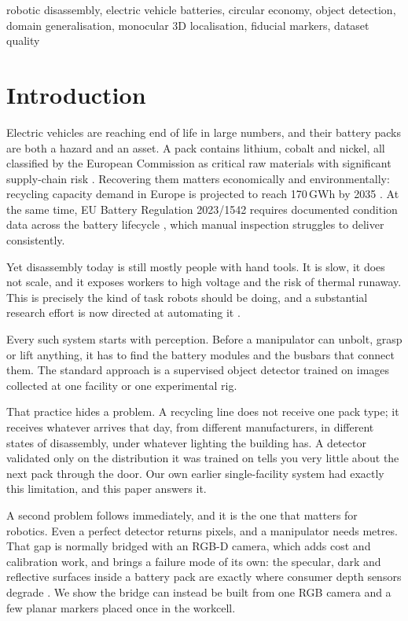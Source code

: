 \documentclass[conference]{IEEEtran}
\begin{document}
\begin{IEEEkeywords}
robotic disassembly, electric vehicle batteries, circular economy, object detection,
domain generalisation, monocular 3D localisation, fiducial markers, dataset quality
\end{IEEEkeywords}

\section{Introduction}

Electric vehicles are reaching end of life in large numbers, and their battery packs
are both a hazard and an asset. A pack contains lithium, cobalt and nickel, all
classified by the European Commission as critical raw materials with significant
supply-chain risk \cite{ec_crm,harper2019}. Recovering them matters economically and
environmentally: recycling capacity demand in Europe is projected to reach 170\,GWh
by 2035 \cite{te2024}. At the same time, EU Battery Regulation 2023/1542 requires
documented condition data across the battery lifecycle \cite{eubattreg}, which manual
inspection struggles to deliver consistently.

Yet disassembly today is still mostly people with hand tools. It is slow, it does not
scale, and it exposes workers to high voltage and the risk of thermal runaway. This
is precisely the kind of task robots should be doing, and a substantial research
effort is now directed at automating it \cite{zang2024robotic,tan2025screws,rapid2026}.

Every such system starts with perception. Before a manipulator can unbolt, grasp or
lift anything, it has to find the battery modules and the busbars that connect them.
The standard approach is a supervised object detector trained on images collected at
one facility or one experimental rig.

That practice hides a problem. A recycling line does not receive one pack type; it
receives whatever arrives that day, from different manufacturers, in different states
of disassembly, under whatever lighting the building has. A detector validated only
on the distribution it was trained on tells you very little about the next pack
through the door. Our own earlier single-facility system
\cite{katiyar2026mvml} had exactly this limitation, and this paper answers it.

A second problem follows immediately, and it is the one that matters for robotics.
Even a perfect detector returns pixels, and a manipulator needs metres. That gap is
normally bridged with an RGB-D camera, which adds cost and calibration work, and
brings a failure mode of its own: the specular, dark and reflective surfaces inside a
battery pack are exactly where consumer depth sensors degrade
\cite{halmetschlager2019}. We show the bridge can instead be built from one RGB
camera and a few planar markers placed once in the workcell.
\end{document}

